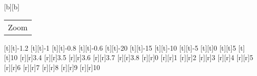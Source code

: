 [b][b]{\fontsize{8.5}{12.75}\selectfont \color[rgb]{0,0,0}\setlength{\tabcolsep}{0pt}\begin{tabular}{c}Zoom\end{tabular}}%
%
\fontsize{8.5}{12.75}%
\selectfont%
%
[t][t]{-1.2}%
[t][t]{-1}%
[t][t]{-0.8}%
[t][t]{-0.6}%
[t][t]{-20}%
[t][t]{-15}%
[t][t]{-10}%
[t][t]{-5}%
[t][t]{0}%
[t][t]{5}%
[t][t]{10}%
%
[r][r]{3.4}%
[r][r]{3.5}%
[r][r]{3.6}%
[r][r]{3.7}%
[r][r]{3.8}%
[r][r]{0}%
[r][r]{1}%
[r][r]{2}%
[r][r]{3}%
[r][r]{4}%
[r][r]{5}%
[r][r]{6}%
[r][r]{7}%
[r][r]{8}%
[r][r]{9}%
[r][r]{10}%
%
%
